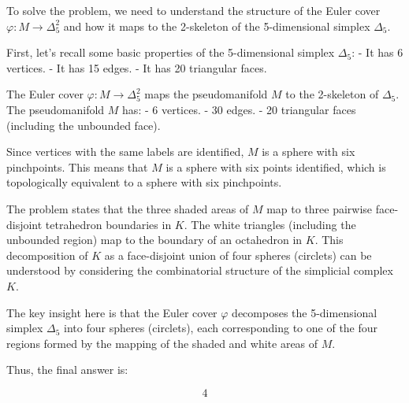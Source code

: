 To solve the problem, we need to understand the structure of the Euler cover \(\varphi: M \to \Delta_5^2\) and how it maps to the 2-skeleton of the 5-dimensional simplex \(\Delta_5\).

First, let's recall some basic properties of the 5-dimensional simplex \(\Delta_5\):
- It has 6 vertices.
- It has 15 edges.
- It has 20 triangular faces.

The Euler cover \(\varphi: M \to \Delta_5^2\) maps the pseudomanifold \(M\) to the 2-skeleton of \(\Delta_5\). The pseudomanifold \(M\) has:
- 6 vertices.
- 30 edges.
- 20 triangular faces (including the unbounded face).

Since vertices with the same labels are identified, \(M\) is a sphere with six pinchpoints. This means that \(M\) is a sphere with six points identified, which is topologically equivalent to a sphere with six pinchpoints.

The problem states that the three shaded areas of \(M\) map to three pairwise face-disjoint tetrahedron boundaries in \(K\). The white triangles (including the unbounded region) map to the boundary of an octahedron in \(K\). This decomposition of \(K\) as a face-disjoint union of four spheres (circlets) can be understood by considering the combinatorial structure of the simplicial complex \(K\).

The key insight here is that the Euler cover \(\varphi\) decomposes the 5-dimensional simplex \(\Delta_5\) into four spheres (circlets), each corresponding to one of the four regions formed by the mapping of the shaded and white areas of \(M\).

Thus, the final answer is:

\[
\boxed{4}
\]